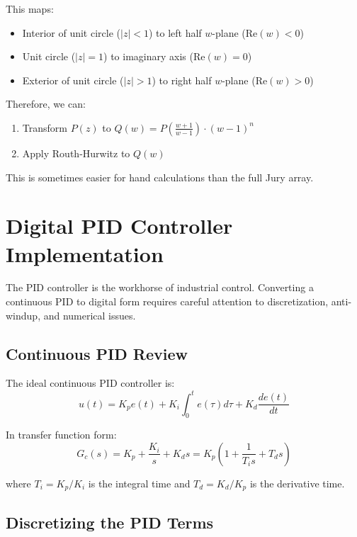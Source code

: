 This maps:
\begin{itemize}
    \item Interior of unit circle ($|z| < 1$) to left half $w$-plane ($\text{Re}(w) < 0$)
    \item Unit circle ($|z| = 1$) to imaginary axis ($\text{Re}(w) = 0$)
    \item Exterior of unit circle ($|z| > 1$) to right half $w$-plane ($\text{Re}(w) > 0$)
\end{itemize}

Therefore, we can:
\begin{enumerate}
    \item Transform $P(z)$ to $Q(w) = P\left(\frac{w+1}{w-1}\right) \cdot (w-1)^n$
    \item Apply Routh-Hurwitz to $Q(w)$
\end{enumerate}

This is sometimes easier for hand calculations than the full Jury array.

\section{Digital PID Controller Implementation}
\label{sec:digital_pid}

The PID controller is the workhorse of industrial control. Converting a continuous PID to digital form requires careful attention to discretization, anti-windup, and numerical issues.

\subsection{Continuous PID Review}

The ideal continuous PID controller is:
\begin{equation}
u(t) = K_p e(t) + K_i \int_0^t e(\tau) d\tau + K_d \frac{de(t)}{dt}
\end{equation}

In transfer function form:
\begin{equation}
G_c(s) = K_p + \frac{K_i}{s} + K_d s = K_p \left(1 + \frac{1}{T_i s} + T_d s\right)
\end{equation}

where $T_i = K_p/K_i$ is the integral time and $T_d = K_d/K_p$ is the derivative time.

\subsection{Discretizing the PID Terms}

